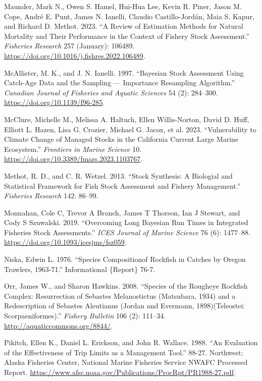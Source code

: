 \documentclass[
]{scrartcl}
\newlength{\cslhangindent}
\newenvironment{CSLReferences}[2] %
 {\begin{list}{}{%
  \setlength{\itemindent}{0pt}
  \setlength{\leftmargin}{0pt}
  \setlength{\parsep}{0pt}
  \ifodd #1
   \setlength{\leftmargin}{\cslhangindent}
   \setlength{\itemindent}{-1\cslhangindent}
  \fi
  \setlength{\itemsep}{#2\baselineskip}}}
 {\end{list}}
\begin{document}
\begin{CSLReferences}{1}{0}
Maunder, Mark N., Owen S. Hamel, Hui-Hua Lee, Kevin R. Piner, Jason M.
Cope, André E. Punt, James N. Ianelli, Claudio Castillo-Jordán, Maia S.
Kapur, and Richard D. Methot. 2023. {``A Review of Estimation Methods
for Natural Mortality and Their Performance in the Context of Fishery
Stock Assessment.''} \emph{Fisheries Research} 257 (January): 106489.
\url{https://doi.org/10.1016/j.fishres.2022.106489}.

McAllister, M. K., and J. N. Ianelli. 1997. {``Bayesian Stock Assessment
Using Catch-Age Data and the Sampling --- Importance Resampling
Algorithm.''} \emph{Canadian Journal of Fisheries and Aquatic Sciences}
54 (2): 284--300. \url{https://doi.org/10.1139/f96-285}.

McClure, Michelle M., Melissa A. Haltuch, Ellen Willis-Norton, David D.
Huff, Elliott L. Hazen, Lisa G. Crozier, Michael G. Jacox, et al. 2023.
{``Vulnerability to Climate Change of Managed Stocks in the {California
Current} Large Marine Ecosystem.''} \emph{Frontiers in Marine Science}
10. \url{https://doi.org/10.3389/fmars.2023.1103767}.

Methot, R. D., and C. R. Wetzel. 2013. {``Stock Synthesis: A Biologial
and Statistical Framework for Fish Stock Assessment and Fishery
Management.''} \emph{Fisheries Research} 142: 86--99.

Monnahan, Cole C, Trevor A Branch, James T Thorson, Ian J Stewart, and
Cody S Szuwalski. 2019. {``Overcoming Long Bayesian Run Times in
Integrated Fisheries Stock Assessments.''} \emph{{ICES} Journal of
Marine Science} 76 (6): 1477--88.
\url{https://doi.org/10.1093/icesjms/fsz059}.

Niska, Edwin L. 1976. {``Species {Compositionof} Rockfish in Catches by
{Oregon} {Trawlers}, 1963-71.''} Informational \{Report\} 76-7.

Orr, James W., and Sharon Hawkins. 2008. {``Species of the Rougheye
Rockfish Complex: Resurrection of {Sebastes} Melanostictus ({Matsubara},
1934) and a Redescription of {Sebastes} Aleutianus ({Jordan} and
{Evermann}, 1898)({Teleostei}: {Scorpaeniformes}).''} \emph{Fishery
Bulletin} 106 (2): 111--34. \url{http://aquaticcommons.org/8844/}.

Pikitch, Ellen K., Daniel L. Erickson, and John R. Wallace. 1988. {``An
Evaluation of the Effectiveness of Trip Limits as a Management Tool.''}
88-27. Northwest; Alaska Fisheries Center, National Marine Fisheries
Service NWAFC Processed Report.
\url{https://www.afsc.noaa.gov/Publications/ProcRpt/PR1988-27.pdf}.


\end{CSLReferences}
\end{document}
